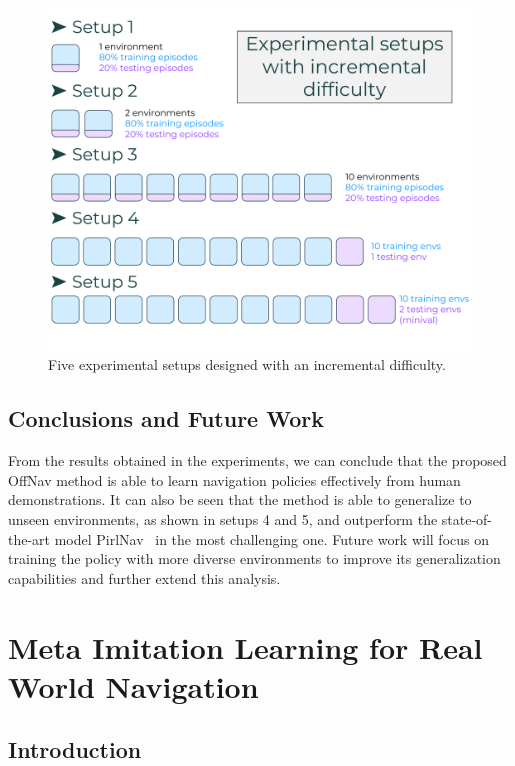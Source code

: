 \begin{figure}
    \centering
    \includegraphics[width=\linewidth]{figures/offnav/experimental_setups}
    \caption{Five experimental setups designed with an incremental difficulty.}
    \label{fig:setups}
\end{figure}

\subsection{Conclusions and Future Work}\label{subsec:conclusions_offnav}

From the results obtained in the experiments, we can conclude that the proposed OffNav method is able to learn navigation policies effectively from human demonstrations.
It can also be seen that the method is able to generalize to unseen environments, as shown in setups 4 and 5, and outperform the state-of-the-art model PirlNav~\cite{ramrakhya2023} in the most challenging one.
Future work will focus on training the policy with more diverse environments to improve its generalization capabilities and further extend this analysis.

\section{Meta Imitation Learning for Real World Navigation}\label{sec:meta-reinforcement-learning-for-real-world-navigation}

\subsection{Introduction}\label{subsec:introduction_metanav}

